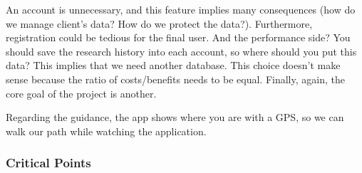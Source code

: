 \documentclass[a4paper]{article}
\begin{document}
\begin{itemize}[label=]
\begin{itemize}[label=]
            An account is unnecessary, and this feature implies many consequences (how do we manage client's data? How do we protect the data?). Furthermore, registration could be tedious for the final user. And the performance side? You should save the research history into each account, so where should you put this data? This implies that we need another database.
            This choice doesn't make sense because the ratio of costs/benefits needs to be equal. Finally, again, the core goal of the project is another. 
            
            Regarding the guidance, the app shows where you are with a GPS, so we can walk our path while watching the application.
        \end{itemize}
    \end{itemize}

    \newpage

    \subsubsection*{Critical Points}
\end{document}
